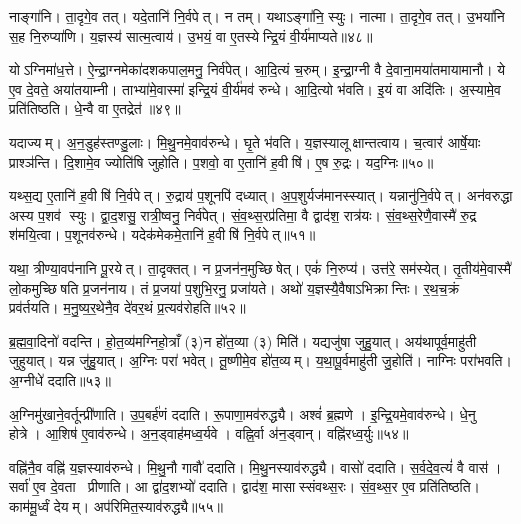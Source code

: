 नाङ्गा॑नि। ता॒दृगे॒व तत्। यदे॒तानि॑ नि॒र्वपेत्। न तम्। यथाऽङ्गा॑नि॒ स्युः। नात्मा। ता॒दृगे॒व तत्। उ॒भया॑नि स॒ह नि॒रुप्या॑णि। य॒ज्ञस्य॑ सात्म॒त्वाय॑। उ॒भयं॒ वा ए॒तस्येन्द्रि॒यं वी॒र्य॑माप्यते॥४८॥

योऽग्निमा॑ध॒त्ते। ऐ॒न्द्रा॒ग्नमेका॑दशकपाल॒मनु॒ निर्व॑पेत्। आ॒दि॒त्यं च॒रुम्। इ॒न्द्रा॒ग्नी वै दे॒वाना॒मया॑तमायामानौ। ये ए॒व दे॒वते॒ अया॑तयाम्नी। ताभ्या॑मे॒वास्मा॑ इन्द्रि॒यं वी॒र्य॑मव॑ रुन्धे। आ॒दि॒त्यो भ॑वति। इ॒यं वा अदि॑तिः। अ॒स्यामे॒व प्रति॑तिष्ठति। धे॒न्वै वा ए॒तद्रेत॑॥४९॥

यदाज्यम्। अ॒न॒डुह॑स्तण्डु॒लाः। मि॒थु॒नमे॒वाव॑रुन्धे। घृ॒ते भ॑वति। य॒ज्ञस्यालूक्षान्तत्वाय। च॒त्वार॑ आर्\mbox{}षे॒याः प्राश्ञ॑न्ति। दि॒शामे॒व ज्योति॑षि जुहोति। प॒शवो॒ वा ए॒तानि॑ ह॒वीषि॑। ए॒ष रु॒द्रः। यद॒ग्निः॥५०॥

यथ्स॒द्य ए॒तानि॑ ह॒वीषि॑ नि॒र्वपेत्। रु॒द्राय॑ प॒शूनपि॑ दध्यात्। अ॒प॒शुर्यज॑मानस्स्यात्। यन्नानु॑नि॒र्वपेत्। अन॑वरुद्धा अस्य प॒शव॑ स्युः। द्वा॒द॒शसु॒ रात्री॒ष्वनु॒ निर्व॑पेत्। सं॒व॒थ्स॒रप्र॑तिमा॒ वै द्वाद॑श॒ रात्र॑यः। सं॒व॒थ्स॒रेणै॒वास्मै॑ रु॒द्र श॑मयि॒त्वा। प॒शूनव॑रुन्धे। यदेक॑मेकमे॒तानि॑ ह॒वीषि॑ नि॒र्वपेत्॥५१॥

यथा॒ त्रीण्या॒वप॑नानि पू॒रयेत्। ता॒दृक्तत्। न प्र॒जन॑न॒मुच्छिषेत्। एकं॑ नि॒रुप्य॑। उत्त॑रे॒ सम॑स्येत्। तृ॒तीय॑मे॒वास्मै॑ लो॒कमुच्छिषति प्र॒जन॑नाय। तं प्र॒जया॑ प॒शुभि॒रनु॒ प्रजा॑यते। अथो॑ य॒ज्ञस्यै॒वैषाऽभिक्रान्तिः। र॒थ॒च॒क्रं प्रव॑र्तयति। म॒नु॒ष्य॒र॒थेनै॒व दे॑वर॒थं प्र॒त्यव॑रोहति॥५२॥

ब्र॒ह्म॒वा॒दिनो॑ वदन्ति। हो॒त॒व्य॑मग्निहो॒त्राँ (३)न हो॑त॒व्या (३) मिति॑। यद्यजु॑षा जुहु॒यात्। अय॑थापूर्व॒माहु॑ती जुहुयात्। यन्न जु॑हु॒यात्। अ॒ग्निः परा॑ भवेत्। तू॒ष्णीमे॒व हो॑त॒व्यम्। य॒था॒पू॒र्वमाहु॑ती जु॒होति॑। नाग्निः परा॑भवति। अ॒ग्नीधे॑ ददाति॥५३॥

अ॒ग्निमु॑खाने॒वर्तून्प्री॑णाति। उ॒प॒बर्\mbox{}ह॑णं ददाति। रू॒पाणा॒मव॑रुद्ध्यै। अश्वं॑ ब्र॒ह्मणे। इ॒न्द्रि॒यमे॒वाव॑रुन्धे। धे॒नु होत्रे। आ॒शिष॑ ए॒वाव॑रुन्धे। अ॒न॒ड्वाह॑मध्व॒र्यवे। वह्नि॒र्वा अ॑न॒ड्वान्। वह्नि॑रध्व॒र्युः॥५४॥

वह्नि॑नै॒व वह्नि॑ य॒ज्ञस्याव॑रुन्धे। मि॒थु॒नौ गावौ॑ ददाति। मि॒थु॒नस्याव॑रुद्ध्यै। वासो॑ ददाति। स॒र्व॒दे॒व॒त्यं॑ वै वास॑। सर्वा॑ ए॒व दे॒वता प्रीणाति। आ द्वा॑द॒शभ्यो॑ ददाति। द्वाद॑श॒ मासास्संवथ्स॒रः। सं॒व॒थ्स॒र ए॒व प्रति॑तिष्ठति। काम॑मू॒र्ध्वं देयम्। अप॑रिमित॒स्याव॑रुद्ध्यै॥५५॥\anuvakamend[आ॒दि॒त्ये तृती॑यम॒फ्स्वासी॒त्तत्तेनावा॑रुन्धत॒ स्यादाप्यते॒ रेतो॒ऽग्निरेक॑मेकमे॒तानि॑ ह॒वीषि॑ नि॒र्वपेत्प्र॒त्यव॑रोहति ददात्यध्व॒र्युर्देय॒मेकं॑ च]

